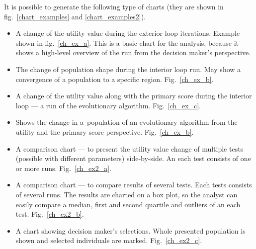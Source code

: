It is possible to generate the following type of charts (they are shown in
fig.~\ref{chart_examples} and \ref{chart_examples2}).
\begin{itemize}
\item A change of the utility value during the exterior loop
  iterations. Example shown in fig.~\ref{ch_ex_a}. This is a basic chart for
  the analysis, because it shows a high-level overview of the run from the
  decision maker's perspective.
\item The change of population shape during the interior loop run. May show a
  convergence of a population to a specific region. Fig.~\ref{ch_ex_b}.
\item A change of the utility value along with the primary score during the
  interior loop --- a run of the evolutionary algorithm. Fig.~\ref{ch_ex_c}.
\item Shows the change in a~population of an evolutionary algorithm from the
  utility and the primary score perspective. Fig.~\ref{ch_ex_b}.
\item A comparison chart --- to present the utility value change of multiple
  tests (possible with different parameters) side-by-side. An each test
  consists of one or more runs. Fig.~\ref{ch_ex2_a}.
\item A comparison chart --- to compare results of several tests. Each tests
  consists of several runs. The results are charted on a box plot, so the
  analyst can easily compare a median, first and second quartile and outliers
  of an each test. Fig.~\ref{ch_ex2_b}.
\item A chart showing decision maker's selections. Whole presented population
  is shown and selected individuals are marked. Fig.~\ref{ch_ex2_c}.
\end{itemize}

